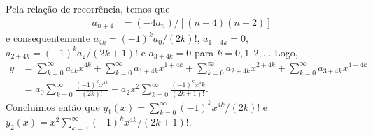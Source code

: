 \documentclass[a4paper,12pt, leqno, answers]{exam}
\begin{document}
\begin{questions}
\begin{solution}
        Pela rela\c{c}\~{a}o de recorr\^{e}ncia, temos que
        \begin{align*}
            a_{n + 4} &= (-4 a_n) / \left[ (n + 4) (n + 2) \right]
        \end{align*}
        e consequentemente $a_{4k} = (-1)^k a_0 / (2k)!$, $a_{1 + 4k} = 0$, $a_{2 + 4k} = (-1)^k a_2 / (2 k + 1)!$ e $a_{3 + 4k} = 0$ para $k = 0, 1, 2, \ldots$ Logo,
        \begin{align*}
            y &= \sum_{k = 0}^\infty a_{4k} x^{4k} + \sum_{k = 0}^\infty a_{1 + 4k} x^{1 + 4k} + \sum_{k = 0}^\infty a_{2 + 4k} x^{2 + 4k} + \sum_{k = 0}^\infty a_{3 + 4k} x^{4 + 4k} \\
            &= a_0 \sum_{k = 0}^\infty \frac{(-1)^k x^{4k}}{(2k)!} + a_2 x^2 \sum_{k = 0}^\infty \frac{(-1)^k x^4k}{(2 k + 1)!}.
        \end{align*}
        Concluimos ent\~{a}o que $y_1(x) = \sum_{k = 0}^\infty (-1)^k x^{4k} / (2k)!$ e $y_2(x) = x^2 \sum_{k = 0}^\infty (-1)^k x^{4k} / (2k + 1)!$.
    \end{solution}


\end{questions}
\end{document}
